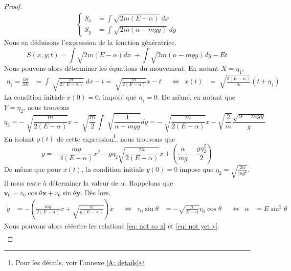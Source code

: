 \documentclass[11pt,oneside,a4paper]{article}
\newcommand{\dif}[2]{\frac{\partial #1}{\partial #2}}
\begin{document}
\begin{proof}
\begin{align}
\begin{cases}
          S_x &= \int \sqrt{2m\left(E-\alpha\right)} \; dx\\
          S_y &= \int \sqrt{2m(\alpha-mgy)} \; dy
        \end{cases}
      \end{align}
      Nous en déduisons l'expression de la fonction génératrice.
      \begin{equation}
        S(x,y;t) = \int \sqrt{2m\left(E-\alpha\right)}dx \; + \int \sqrt{2m(\alpha-mgy)}dy - Et
      \end{equation}
      Nous pouvons alors déterminer les équations du mouvement. En notant $X = \eta_1$,
      \begin{align}
        \eta_1 = \dif{S}{E} &= \int \sqrt[]{\frac{m}{2\left(E-\alpha\right)}}\;dx - t = \sqrt[]{\frac{m}{2\left(E-\alpha\right)}}x - t & &\Leftrightarrow & x(t) &= \sqrt[]{\frac{2\left(E-\alpha\right)}{m}}\left(t+\eta_1\right)\label{eq: not so x}
      \end{align}
      La condition initiale $x(0) = 0$, impose que $\eta_1 = 0$. De même, en notant que $Y = \eta_2$, nous trouvons
      \begin{equation}
        \eta_2 = -\sqrt[]{\frac{m}{2\left(E-\alpha\right)}}x+\sqrt[]{\frac{m}{2}}\int \sqrt[]{\frac{1}{\alpha-mgy}}dy = -\sqrt[]{\frac{m}{2\left(E-\alpha\right)}}x-\sqrt{\frac{2}{m}}\frac{\sqrt{\alpha-mgy}}{g}\label{eq: eta 2}
      \end{equation}
      En isolant $y(t)$ de cette expression\footnote{Pour les détails, voir l'annexe \ref{A: details}}, nous trouvons que
      \begin{equation}
        y = -\frac{mg}{4\left(E-\alpha\right)}x^2-g\eta_2\sqrt{\frac{m}{2\left(E-\alpha\right)}}x+\left(\frac{\alpha}{mg}-\frac{g\eta_2^2}{2}\right)\label{eq: not yet y}
      \end{equation}
      De même que pour $x(t)$, la condition initiale $y(0) = 0$ impose que $\eta_2 = \sqrt{\frac{2\alpha}{mg^2}}$. Il nous reste à déterminer la valeur de $\alpha$. Rappelons que $\bm{v}_0 = v_0\cos\theta\bm{x}+v_0\sin\theta\bm{y}$. Dès lors,
      \begin{align}
        \dot{y} &= -\left(\frac{mg}{2\left(E-\alpha\right)}x+\sqrt{\frac{\alpha}{g\left(E-\alpha\right)}}\right)\dot{x} & &\Leftrightarrow & v_0\sin\theta &= -\sqrt{\frac{\alpha}{E-\alpha}}v_0\cos\theta & &\Leftrightarrow & \alpha &= E\sin^2\theta
      \end{align}
      Nous pouvons alors réécrire les relations \eqref{eq: not so x} et \eqref{eq: not yet y}.
      \begin{align}

\end{align}
\end{proof}
\end{document}
